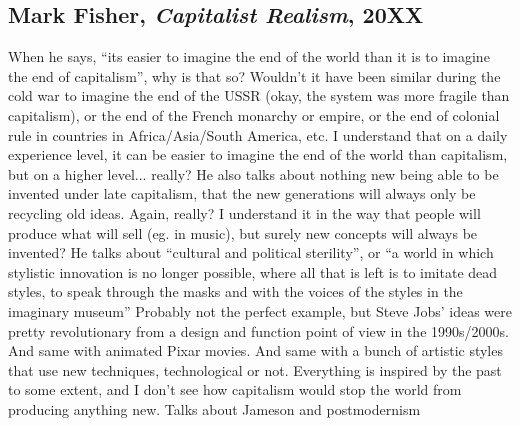 \documentclass{article}
\begin{document}
\subsection{Mark Fisher, \textit{Capitalist Realism}, 20XX}

\begin{outline}
	\1 When he says, ``its easier to imagine the end of the world than it is to imagine the end of capitalism'', why is that so? Wouldn't it have been similar during the cold war to imagine the end of the USSR (okay, the system was more fragile than capitalism), or the end of the French monarchy or empire, or the end of colonial rule in countries in Africa/Asia/South America, etc. I understand that on a daily experience level, it can be easier to imagine the end of the world than capitalism, but on a higher level... really?
	\1 He also talks about nothing new being able to be invented under late capitalism, that the new generations will always only be recycling old ideas. Again, really? I understand it in the way that people will produce what will sell (eg. in music), but surely new concepts will always be invented?
		\2 He talks about ``cultural and political sterility'', or ``a world in which stylistic innovation is no longer possible, where all that is left is to imitate dead styles, to speak through the masks and with the voices of the styles in the imaginary museum''
		\2 Probably not the perfect example, but Steve Jobs' ideas were pretty revolutionary from a design and function point of view in the 1990s/2000s. And same with animated Pixar movies. And same with a bunch of artistic styles that use new techniques, technological or not. Everything is inspired by the past to some extent, and I don't see how capitalism would stop the world from producing anything new.
	\1 Talks about Jameson and postmodernism
\end{outline}

\printbibliography


\begin{outline}
	\1 
\end{outline}
\fi
\end{document}
